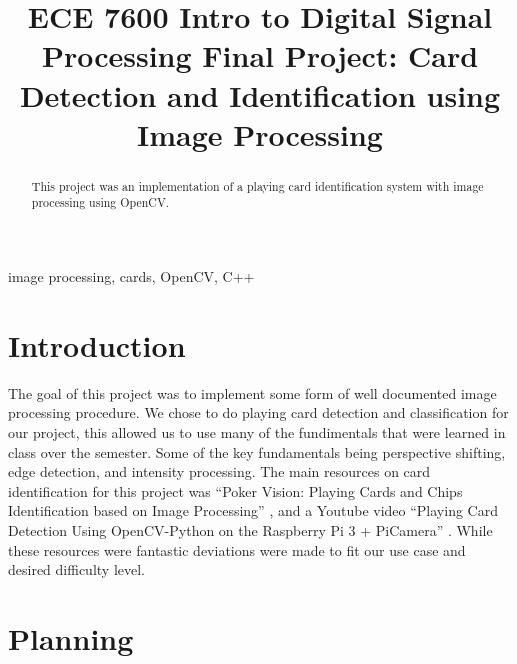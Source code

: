 \documentclass[conference]{IEEEtran}
\begin{document}
\title{ECE 7600 Intro to Digital Signal Processing Final Project:
Card Detection and Identification using Image Processing
}

\author{
\and
{}
}

\maketitle

\begin{abstract}
    This project was an implementation of a playing card identification system with image processing
    using OpenCV.
\end{abstract}

\begin{IEEEkeywords}
image processing, cards, OpenCV, C++
\end{IEEEkeywords}

\section{Introduction}
The goal of this project was to implement some form of well documented image processing procedure.
We chose to do playing card detection and classification for our project, this allowed us to use
many of the fundimentals that were learned in class over the semester. Some of the key fundamentals
being perspective shifting, edge detection, and intensity processing. The main resources on card
identification for this project was ``Poker Vision: Playing Cards and Chips Identification based on
Image Processing'' \cite{poker-vision}, and a Youtube video ``Playing Card Detection Using
OpenCV-Python on the Raspberry Pi 3 + PiCamera'' \cite{opencv-card-detection}. While these
resources were fantastic deviations were made to fit our use case and desired difficulty level.

\section{Planning}
\end{document}
